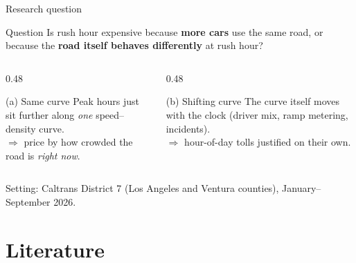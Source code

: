 \documentclass[compress]{beamer}
\newcommand{\hl}[1]{{\color{IITRBlue}\textbf{#1}}}
\begin{document}
\begin{frame}[t]{Research question}
\begin{block}{Question}
Is rush hour expensive because \hl{more cars} use the same road, or because the \hl{road itself behaves differently} at rush hour?
\end{block}
\vspace{0.3em}
\begin{columns}[T]
\begin{column}{0.48\textwidth}
\begin{block}{(a) Same curve}
Peak hours just sit further along \emph{one} speed--density curve.\\[0.3em]
$\Rightarrow$ price by how crowded the road is \emph{right now}.
\end{block}
\end{column}
\begin{column}{0.48\textwidth}
\begin{block}{(b) Shifting curve}
The curve itself moves with the clock (driver mix, ramp metering, incidents).\\[0.3em]
$\Rightarrow$ hour-of-day tolls justified on their own.
\end{block}
\end{column}
\end{columns}
\vspace{0.5em}
\small Setting: Caltrans District 7 (Los Angeles and Ventura counties), January--September 2026.
\end{frame}

\section{Literature}
\end{document}
